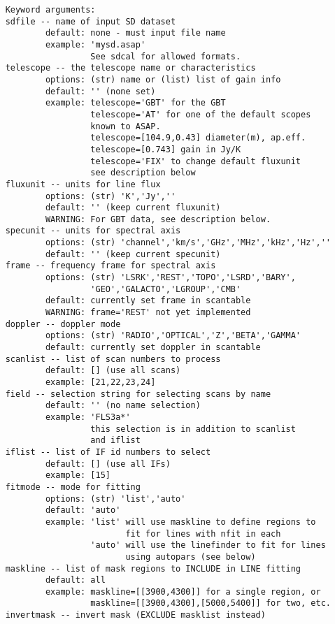 \begin{itemize}
\begin{verbatim}
    Keyword arguments:
    sdfile -- name of input SD dataset
            default: none - must input file name
            example: 'mysd.asap'
                     See sdcal for allowed formats.
    telescope -- the telescope name or characteristics
            options: (str) name or (list) list of gain info
            default: '' (none set)
            example: telescope='GBT' for the GBT
                     telescope='AT' for one of the default scopes
                     known to ASAP.
                     telescope=[104.9,0.43] diameter(m), ap.eff.
                     telescope=[0.743] gain in Jy/K
                     telescope='FIX' to change default fluxunit
                     see description below
    fluxunit -- units for line flux
            options: (str) 'K','Jy',''
            default: '' (keep current fluxunit)
            WARNING: For GBT data, see description below.
    specunit -- units for spectral axis
            options: (str) 'channel','km/s','GHz','MHz','kHz','Hz',''
            default: '' (keep current specunit)
    frame -- frequency frame for spectral axis
            options: (str) 'LSRK','REST','TOPO','LSRD','BARY',
                     'GEO','GALACTO','LGROUP','CMB'
            default: currently set frame in scantable
            WARNING: frame='REST' not yet implemented
    doppler -- doppler mode
            options: (str) 'RADIO','OPTICAL','Z','BETA','GAMMA'
            default: currently set doppler in scantable
    scanlist -- list of scan numbers to process
            default: [] (use all scans)
            example: [21,22,23,24]
    field -- selection string for selecting scans by name
            default: '' (no name selection)
            example: 'FLS3a*'
                     this selection is in addition to scanlist
                     and iflist
    iflist -- list of IF id numbers to select
            default: [] (use all IFs)
            example: [15]
    fitmode -- mode for fitting
            options: (str) 'list','auto'
            default: 'auto'
            example: 'list' will use maskline to define regions to
                            fit for lines with nfit in each
                     'auto' will use the linefinder to fit for lines
                            using autopars (see below)
    maskline -- list of mask regions to INCLUDE in LINE fitting
            default: all
            example: maskline=[[3900,4300]] for a single region, or
                     maskline=[[3900,4300],[5000,5400]] for two, etc.
    invertmask -- invert mask (EXCLUDE masklist instead)

\end{verbatim}
\end{itemize}
